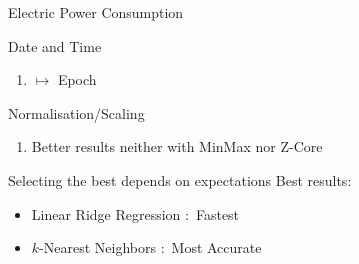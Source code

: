 \begin{frame}{Electric Power Consumption}


\begin{tcolorbox}[colback=LightSteelBlue!5,colframe=yellow!40!black,title=Facts]

\bi
\mi Date and Time 
\begin{enumerate}
    \item $\mapsto$ Epoch
  \end{enumerate}
  
  \mi Normalisation/Scaling 
\begin{enumerate}
    \item Better results neither with MinMax nor Z-Core
  \end{enumerate}
 
\mi Selecting the best depends on expectations
  \mi Best results:
  \begin{itemize}
    \item Linear Ridge Regression $:$ Fastest
    \item $k$-Nearest Neighbors $:$ Most Accurate
  \end{itemize}
\ei


\end{tcolorbox}

\end{frame}